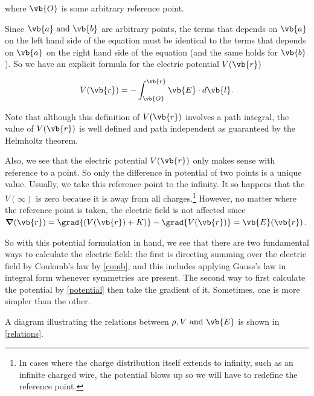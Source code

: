 \documentclass[a4paper,12pt]{report}
\begin{document}
	where \(\vb{O} \) is some arbitrary reference point.
	
	Since \(\vb{a} \text{ and }  \vb{b} \) are arbitrary points, the terms that depends on \(\vb{a} \) on the left hand side of the equation must be identical to the terms that depends on \(\vb{a} \) on the right hand side of the equation (and the same holds for \(\vb{b} \) ). So we have an explicit formula for the electric potential \(V(\vb{r} )\) 
	
	\begin{equation}
		V(\vb{r} ) = -\int_{\vb{O} }^{\vb{r} } \vb{E} \cdot d\vb{l} . 
	\end{equation}
	
	Note that although this definition of \(V(\vb{r} )\) involves a path integral, the value of \(V(\vb{r} )\) is well defined and path independent as guaranteed by the Helmholtz theorem.
	
	Also, we see that the electric potential \(V(\vb{r} )\) only makes sense with reference to a point. So only the difference in potential of two points is a unique value. Usually, we take this reference point to the infinity. It so happens that the \(V(\infty)\) is zero because it is away from all charges.\footnote{In cases where the charge distribution itself extends to infinity, such as an infinite charged wire, the potential blows up so we will have to redefine the reference point.} However, no matter where the reference point is taken, the electric field is not affected since \(\boldsymbol{\nabla}(\vb{r} ) = \grad{(V(\vb{r} ) + K)} - \grad{V(\vb{r} )} = \vb{E} (\vb{r} )\).
	
	
	So with this potential formulation in hand, we see that there are two fundamental ways to calculate the electric field: the first is directing summing over the electric field by Coulomb's law by \cref{comb}, and this includes applying Gauss's law in integral form whenever symmetries are present. The second way to first calculate the potential by \cref{potential} then take the gradient of it. Sometimes, one is more simpler than the other.
	
	
	A diagram illustrating the relations between \(\rho , V \text{ and } \vb{E} \) is shown in \cref{relations}.  
	
\end{document}
